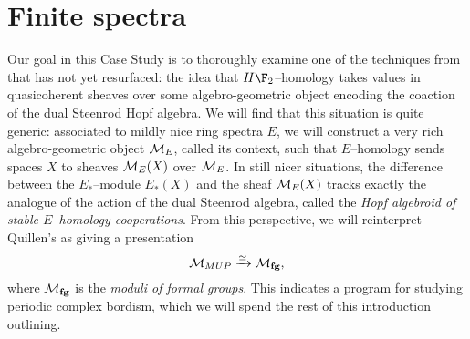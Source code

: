 
\chapter{Finite spectra}\label{ChapterFiniteSpectra}




Our goal in this Case Study is to thoroughly examine one of the techniques from  that has not yet resurfaced: the idea that $H\F_2$--homology takes values in quasicoherent sheaves over some algebro-geometric object encoding the coaction of the dual Steenrod Hopf algebra.  We will find that this situation is quite generic: associated to mildly nice ring spectra $E$, we will construct a very rich algebro-geometric object $\mathcal{M}_{E}$, called its context, such that $E$--homology sends spaces $X$ to sheaves $\mathcal{M}_{E}(X)$ over $\mathcal{M}_{E}$.  In still nicer situations, the difference between the $E_*$--module $E_*(X)$ and the sheaf $\mathcal{M}_{E}(X)$ tracks exactly the analogue of the action of the dual Steenrod algebra, called the \textit{Hopf algebroid of stable $E$--homology cooperations}.  From this perspective, we will reinterpret Quillen's  as giving a presentation \[\mathcal{M}_{MUP} \xrightarrow{\simeq} \mathcal{M}_{\mathbf{fg}},\] where $\mathcal{M}_{\mathbf{fg}}$ is the \textit{moduli of formal groups}.  This indicates a program for studying periodic complex bordism, which we will spend the rest of this introduction outlining.

